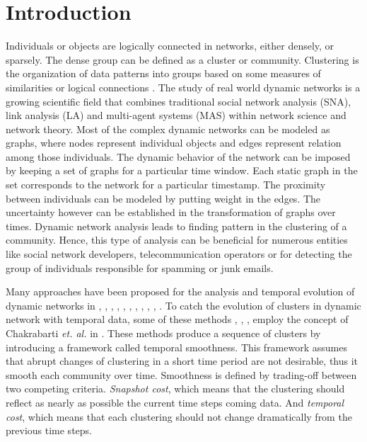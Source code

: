 \documentclass[12pt]{arsubmit}
\begin{document}
\section{Introduction}
Individuals or objects are logically connected in networks, either densely, or sparsely. The dense group can be defined as a cluster or community. Clustering is the organization of data patterns into groups based on some measures of similarities or logical connections \cite{jain}. The study of real world dynamic networks is a growing scientific field that combines traditional social network analysis (SNA), link analysis (LA) and multi-agent systems (MAS) within network science and network theory. 
Most of the complex dynamic networks can be modeled as graphs, where nodes represent individual objects and edges represent relation among those individuals. The dynamic behavior of the network can be imposed by keeping a set of graphs for a particular time window. Each static graph in the set corresponds to the network for a particular timestamp. The proximity between individuals can be modeled by putting weight in the edges. The uncertainty however can be established in the transformation of graphs over times. Dynamic network analysis leads to finding pattern in the clustering of a community. Hence, this type of analysis can be beneficial for numerous entities like social network developers, telecommunication operators or for detecting the group of individuals responsible for spamming or junk emails.


Many approaches have been proposed for the analysis and temporal evolution of dynamic networks in \cite{dynmoga1}, \cite{dynmoga3}, \cite{dynmoga12}, \cite{dynmoga13}, \cite{dynmoga14}, \cite{dynmoga15}, \cite{dynmoga21}, \cite{dynmoga23}, \cite{dynmoga24}, \cite{dynmoga25}, \cite{dynmoga26}. To catch the evolution of clusters in dynamic network with temporal data, some of these methods \cite{dynmoga3}, \cite{dynmoga12}, \cite{dynmoga15}, \cite{dynmoga24} employ the concept of Chakrabarti \emph{et. al.} in \cite{chakrabarti}. These methods produce a sequence of clusters by introducing a framework called temporal smoothness. This framework assumes that abrupt changes of clustering in a short time period are not desirable, thus it smooth each community over time. Smoothness is defined by trading-off between two competing criteria. \emph{Snapshot cost}, which means that the clustering should reflect as nearly as possible the current time steps coming data.  And \emph{temporal cost}, which means that each clustering should not change dramatically from the previous time steps.
\end{document}
